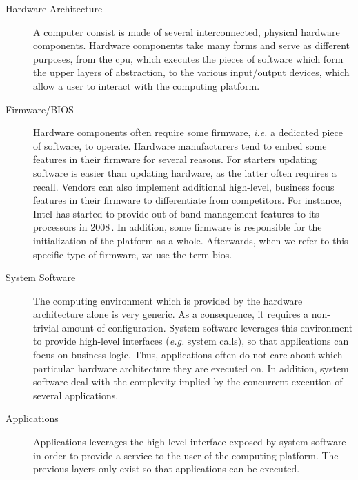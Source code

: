 \begin{description}
\item [Hardware Architecture]
  A computer consist is made of several inter\-connected, physical hardware
  components.
  Hardware components take many forms and serve as different purposes, from the
  \ac{cpu}, which executes the pieces of software which form the upper layers of
  abstraction, to the various input/output devices, which allow a user to
  interact with the computing platform.
\item [Firmware/BIOS]
  Hardware components often require some firm\-ware, \emph{i.e.} a dedicated
  piece of software, to operate.
  Hardware manufacturers tend to embed some features in their firmware for
  several reasons.
  For starters updating software is easier than updating hardware, as the latter
  often requires a recall.
  Vendors can also implement additional high-level, business focus features in
  their firmware to differentiate from competitors.
  For instance, Intel has started to provide out-of-band management features to
  its processors in 2008\,\cite{ruan2014me}.
  In addition, some firmware is responsible for the initialization of the
  platform as a whole.
  Afterwards, when we refer to this specific type of firmware, we use the term
  \ac{bios}.
\item [System Software]
  The computing environment which is provided by the hardware architecture alone
  is very generic.
  As a consequence, it requires a non-trivial amount of configuration.
  System software leverages this environment to provide high-level interfaces
  (\emph{e.g.} system calls), so that applications can focus on business
  logic. Thus, applications often do not care about which particular hardware
  architecture they are executed on.
  In addition, system software deal with the complexity implied by the
  concurrent execution of several applications.
\item [Applications]
  Applications leverages the high-level interface exposed by system software in
  order to provide a service to the user of the computing platform.
  The previous layers only exist so that applications can be executed.
\end{description}

